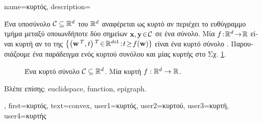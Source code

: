 {name={\foreignlanguage{greek}{κυρτός}},
	description={\foreignlanguage{greek}{Ένα υποσύνολο} 
		$\mathcal{C} \subseteq \mathbb{R}^{d}$  
		\foreignlanguage{greek}{του}  $\mathbb{R}^{d}$ \foreignlanguage{greek}{αναφέρεται ως κυρτό αν περιέχει  
		το ευθύγραμμο τμήμα μεταξύ οποιωνδήποτε δύο σημεί\-ων ${\bf x}, {\bf y}\!\in\!\mathcal{C}$ σε ένα σύνολο. Μία}   
		$f\!:\!\mathbb{R}^{d}\!\rightarrow\!\mathbb{R}$ \foreignlanguage{greek}{είναι κυρτή αν το} 
		 \foreignlanguage{greek}{της} $\big\{ \big( \weights\,^{T},t \big)\,^{T}\!\in\!\mathbb{R}^{\dimlocalmodel\!+\!1}\!:\!t\!\geq\!f(\weights) \}$ 
		\foreignlanguage{greek}{είναι ένα κυρτό σύνολο} \cite{BoydConvexBook}. \foreignlanguage{greek}{Παρουσιάζουμε ένα παράδειγμα 
		ενός κυρτού συνόλου και μίας κυρτής}  \foreignlanguage{greek}{στο Σχ.} \ref{fig_convex_set_function_dict}. 
		\begin{figure}[H]
		\begin{center}
			\vspace*{-8mm}
			\end{center}
			{
			\caption{ \foreignlanguage{greek}{Ένα κυρτό σύνολο} $\mathcal{C} \subseteq \mathbb{R}^{d}$. 
				 \foreignlanguage{greek}{Μία κυρτή}  $f: \mathbb{R}^{d} \rightarrow \mathbb{R}$.
				\label{fig_convex_set_function_dict}} }
		\end{figure}
		\foreignlanguage{greek}{Βλέπε επίσης:} \gls{euclidspace}, \gls{function}, \gls{epigraph}.},
	first={\foreignlanguage{greek}{κυρτός}},
	text={convex},
	user1={\foreignlanguage{greek}{κυρτός}}, %
	user2={\foreignlanguage{greek}{κυρτού}}, %
	user3={\foreignlanguage{greek}{κυρτή}}, %
	user4={\foreignlanguage{greek}{κυρτής}} %
}

